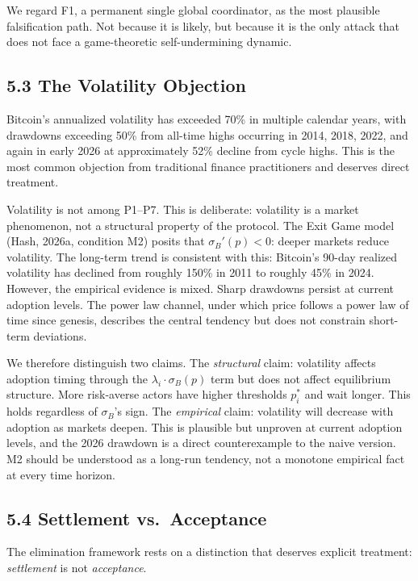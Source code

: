 \documentclass[12pt]{article}
\theoremstyle{definition}
\theoremstyle{remark}
\begin{document}
We regard F1, a permanent single global coordinator, as the most
plausible falsification path. Not because it is likely, but because it
is the only attack that does not face a game-theoretic self-undermining
dynamic.

\subsection{5.3 The Volatility Objection}

Bitcoin's annualized volatility has exceeded 70\% in multiple calendar
years, with drawdowns exceeding 50\% from all-time highs occurring in
2014, 2018, 2022, and again in early 2026 at approximately 52\% decline
from cycle highs. This is the most common objection from traditional
finance practitioners and deserves direct treatment.

Volatility is not among P1--P7. This is deliberate: volatility is a
market phenomenon, not a structural property of the protocol. The Exit
Game model (Hash, 2026a, condition M2) posits that
$\sigma_B'(p) < 0$: deeper markets reduce volatility. The long-term
trend is consistent with this: Bitcoin's 90-day realized volatility
has declined from roughly 150\% in 2011 to roughly 45\% in 2024.
However, the empirical evidence is mixed. Sharp drawdowns persist at
current adoption levels. The power law channel, under which price
follows a power law of time since genesis, describes the central
tendency but does not constrain short-term deviations.

We therefore distinguish two claims. The \emph{structural} claim:
volatility affects adoption timing through the $\lambda_i \cdot
\sigma_B(p)$ term but does not affect equilibrium structure. More
risk-averse actors have higher thresholds $p_i^*$ and wait longer. This
holds regardless of $\sigma_B$'s sign. The \emph{empirical} claim:
volatility will decrease with adoption as markets deepen. This is
plausible but unproven at current adoption levels, and the 2026
drawdown is a direct counterexample to the naive version. M2 should be
understood as a long-run tendency, not a monotone empirical fact at
every time horizon.

\subsection{5.4 Settlement vs.~Acceptance}

The elimination framework rests on a distinction that deserves explicit
treatment: \emph{settlement} is not \emph{acceptance}.
\end{document}
